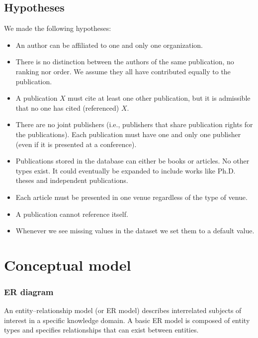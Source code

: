 \documentclass{Configuration_Files/PoliMi3i_thesis}
\begin{document}
\section{Hypotheses}
\label{sec:section_name}
We made the following hypotheses:
\begin{itemize}
    \item An author can be affiliated to one and only one organization.
    \item There is no distinction between the authors of the same publication, no ranking nor order. We assume they all have contributed equally to the publication.
    \item A publication $X$ must cite at least one other publication, but it is admissible that no one has cited (referenced) $X$.
    \item There are no joint publishers (i.e., publishers that share publication rights for the publications). Each publication must have one and only one publisher (even if it is presented at a conference).
    \item Publications stored in the database can either be books or articles. No other types exist. It could eventually be expanded to include works like Ph.D. theses and independent publications.
    \item Each article must be presented in one venue regardless of the type of venue.
    \item A publication cannot reference itself.
    \item Whenever we see missing values in the dataset we set them to a default value.
\end{itemize}
\chapter{Conceptual model}
\label{ch:chapter_one}


\subsection{ER diagram}
\label{subsec:figures}

An entity–relationship model (or ER model) describes interrelated subjects of interest in a specific knowledge domain. A basic ER model is composed of entity types and specifies relationships that can exist between entities.
\end{document}
